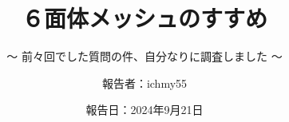 %
\title{６面体メッシュのすすめ}
\subtitle{～ 前々回でした質問の件、自分なりに調査しました ～}
%
%
%
\date[Sep.21st,2024]{報告日：2024年9月21日}
\author[ichmy55]{報告者：ichmy55}
\subject{Recommendation for hexahedral mesh}
